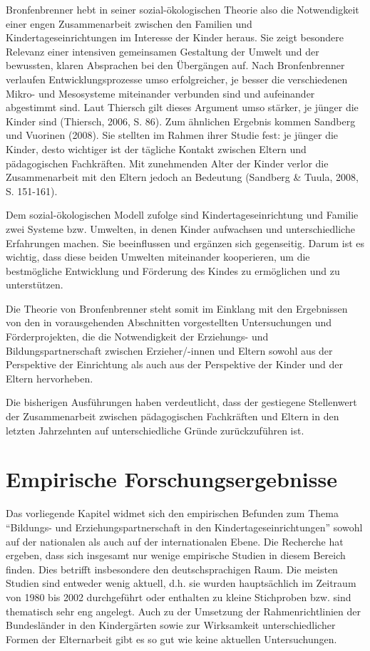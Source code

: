 \documentclass[12pt,a4paper]{article}
\begin{document}
	Bronfenbrenner hebt in seiner sozial-ökologischen Theorie also die Notwendigkeit einer engen Zusammenarbeit zwischen den Familien und Kindertageseinrichtungen im Interesse der Kinder heraus. Sie zeigt besondere Relevanz einer intensiven gemeinsamen Gestaltung der Umwelt und der bewussten, klaren Absprachen bei den Übergängen auf. Nach Bronfenbrenner verlaufen Entwicklungsprozesse umso erfolgreicher, je besser die verschiedenen Mikro- und Mesosysteme miteinander verbunden sind und aufeinander abgestimmt sind. Laut Thiersch gilt dieses Argument umso stärker, je jünger die Kinder sind (Thiersch, 2006, S. 86). Zum ähnlichen Ergebnis kommen Sandberg und Vuorinen (2008). Sie stellten im Rahmen ihrer Studie fest: je jünger die Kinder, desto wichtiger ist der tägliche Kontakt zwischen Eltern und pädagogischen Fachkräften. Mit zunehmenden Alter der Kinder verlor die Zusammenarbeit mit den Eltern jedoch an Bedeutung (Sandberg \& Tuula, 2008, S. 151-161).
	
	Dem sozial-ökologischen Modell zufolge sind Kindertageseinrichtung und Familie zwei Systeme bzw. Umwelten, in denen Kinder aufwachsen und unterschiedliche Erfahrungen machen. Sie beeinflussen und ergänzen sich gegenseitig. Darum ist es wichtig, dass diese beiden Umwelten miteinander kooperieren, um die bestmögliche Entwicklung und Förderung des Kindes zu ermöglichen und zu unterstützen. 
	
Die Theorie von Bronfenbrenner steht somit im Einklang mit den Ergebnissen von den in vorausgehenden Abschnitten vorgestellten Untersuchungen und Förderprojekten, die die Notwendigkeit der Erziehungs- und Bildungspartnerschaft zwischen Erzieher/-innen und Eltern sowohl aus der Perspektive der Einrichtung als auch aus der Perspektive der Kinder und der Eltern hervorheben. 

Die bisherigen Ausführungen haben verdeutlicht, dass der gestiegene Stellenwert der Zusammenarbeit zwischen pädagogischen Fachkräften und Eltern in den letzten Jahrzehnten auf unterschiedliche Gründe zurückzuführen ist.

\section{Empirische Forschungsergebnisse}  
Das vorliegende Kapitel widmet sich den empirischen Befunden zum Thema "`Bil\-dungs- und Erziehungspartnerschaft in den Kindertageseinrichtungen"' sowohl auf der nationalen als auch auf der internationalen Ebene. Die Recherche hat ergeben, dass sich insgesamt nur wenige empirische Studien in diesem Bereich finden. Dies betrifft insbesondere den deutschsprachigen Raum. Die meisten Studien sind entweder wenig aktuell, d.h. sie wurden hauptsächlich im Zeitraum von 1980 bis 2002 durchgeführt oder enthalten zu kleine Stichproben bzw. sind thematisch sehr eng angelegt. Auch zu der Umsetzung der Rahmenrichtlinien der Bundesländer in den Kindergärten sowie zur Wirksamkeit unterschiedlicher Formen der Elternarbeit gibt es so gut wie keine aktuellen Untersuchungen.
\end{document}
